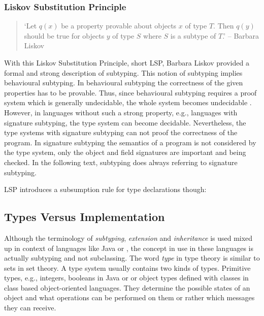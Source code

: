 \subsubsection{Liskov Substitution Principle}
\begin{quotation}
`Let $q(x)$ be a property provable about objects $x$ of type $T$. Then
$q(y)$ should be true for objects $y$ of type $S$ where $S$ is a subtype
of $T$.' -- Barbara Liskov \cite{liskov_behavioral_2001}
\end{quotation}

With this Liskov Substitution Principle, short LSP, Barbara Liskov
provided a formal and strong description  of subtyping. This
notion of subtyping implies behavioural subtyping. In behavioural
subtyping the correctness of the given properties has to be
provable. Thus, since behavioural subtyping requires a proof system
which is generally undecidable, the whole system becomes undecidable
\cite{poll_behavioural_1998}. However, in languages without such a strong
property, e.g., languages with signature subtyping, the type system can
become decidable. Nevertheless, the type systems with signature subtyping
can not proof the correctness of the program. In signature subtyping
the semantics of a program is not considered by the type system, only
the object and field signatures are important and being checked.  In the
following text, subtyping does always referring to signature subtyping.

LSP introduces a subsumption rule for type declarations though:

\begin{defn}[Subsumption]
\label{def:subsumption}
	\begin{mathpar}
	\end{mathpar}
\end{defn}

\subsection{Types Versus Implementation}
\label{sec:sharingTypes}
Although the terminology of \emph{subtyping}, \emph{extension} and
\emph{inheritance} is used mixed up in context of languages like Java
or \cpp, the concept in use in these languages is actually subtyping and not subclassing.
The word \emph{type} in type theory is similar to sets in set theory. A
type system usually contains two kinds of types. Primitive types,
e.g., integers, booleans in Java or \cpp or object types defined with
classes in class based object-oriented languages. They determine the
possible states of an object and what operations can be performed on them
or rather which messages they can receive.

